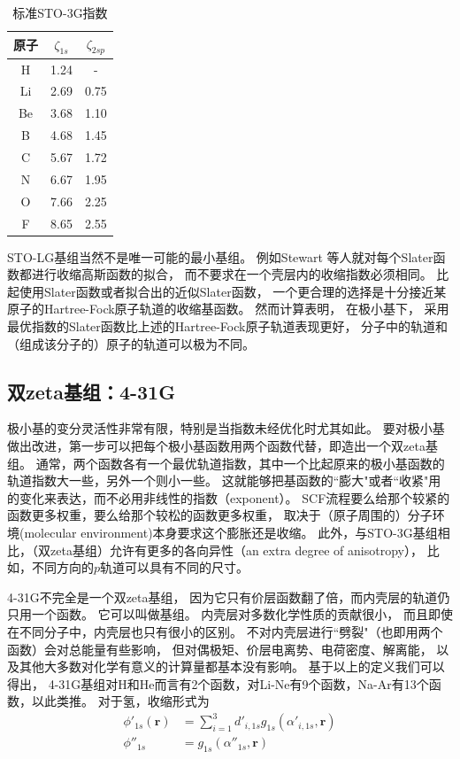 \begin{table}[h]
	\centering\caption{标准STO-3G指数}
	\begin{tabular}{ccc}
		\hline
		原子&$\zeta_{1s}$&$\zeta_{2sp}$\\\hline
		H	 &1.24&-\\
		Li	 &2.69&0.75\\		
		Be	 &3.68&1.10\\
		B	 &4.68&1.45\\
		C	 &5.67&1.72\\
		N	 &6.67&1.95\\		
		O	 &7.66&2.25\\
		F	 &8.65&2.55\\
		\hline
	\end{tabular}
	\label{t3.8}
\end{table}

STO-LG基组当然不是唯一可能的最小基组。
例如Stewart\endnote{
}
等人就对每个Slater函数都进行收缩高斯函数的拟合，
而不要求在一个壳层内的收缩指数必须相同。
比起使用Slater函数或者拟合出的近似Slater函数，
一个更合理的选择是十分接近某原子的Hartree-Fock原子轨道的收缩基函数。
然而计算表明，
在极小基下，
采用最优指数的Slater函数比上述的Hartree-Fock原子轨道表现更好，
分子中的轨道和（组成该分子的）原子的轨道可以极为不同。

\subsection{双zeta基组：4-31G}
极小基的变分灵活性非常有限，特别是当指数未经优化时尤其如此。
要对极小基做出改进，第一步可以把每个极小基函数用两个函数代替，即造出一个双zeta基组。
通常，两个函数各有一个最优轨道指数，其中一个比起原来的极小基函数的轨道指数大一些，另外一个则小一些。
这就能够把基函数的``膨大"或者``收紧"用的变化来表达，而不必用非线性的指数（exponent）。
SCF流程要么给那个较紧的函数更多权重，要么给那个较松的函数更多权重，
取决于（原子周围的）分子环境(molecular environment)本身要求这个膨胀还是收缩。
此外，与STO-3G基组相比，（双zeta基组）允许有更多的各向异性（an extra degree of anisotropy），
比如，不同方向的$p$轨道可以具有不同的尺寸。

4-31G不完全是一个双zeta基组，
因为它只有价层函数翻了倍，而内壳层的轨道仍只用一个函数。
它可以叫做基组。
内壳层对多数化学性质的贡献很小，
而且即使在不同分子中，内壳层也只有很小的区别。
不对内壳层进行``劈裂"（也即用两个函数）会对总能量有些影响，
但对偶极矩、价层电离势、电荷密度、解离能，
以及其他大多数对化学有意义的计算量都基本没有影响。
基于以上的定义我们可以得出，
4-31G基组对H和He而言有2个函数，对Li-Ne有9个函数，Na-Ar有13个函数，以此类推。
对于氢，收缩形式为
\begin{align}
    \phi'_{1s}(\mathbf{r}) & = \sum_{i=1}^3 d'_{i,1s}g_{1s}(\alpha'_{i,1s}, \mathbf{r})
    \\
    \phi''_{1s} & = g_{1s}(\alpha''_{1s},\mathbf{r}) 
\end{align}

